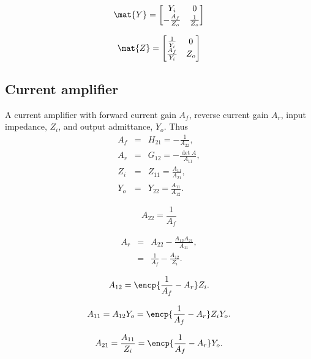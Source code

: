 \documentclass[a4paper, 12pt]{article}
\begin{document}
\begin{equation}
\mat{Y} = \left[\begin{matrix}Y_{i} & 0\\- \frac{A_{f}}{Z_{o}} & \frac{1}{Z_{o}}\end{matrix}\right]
\end{equation}

\begin{equation}
\mat{Z} = \left[\begin{matrix}\frac{1}{Y_{i}} & 0\\\frac{A_{f}}{Y_{i}} & Z_{o}\end{matrix}\right]
\end{equation}


\subsection{Current amplifier}

A current amplifier with forward current gain $A_f$, reverse current
gain $A_r$, input impedance, $Z_i$, and output admittance, $Y_o$.
Thus
%
\begin{eqnarray}
A_f & = &  H_{21} = -\frac{1}{A_{22}}, \\
A_r & = &  G_{12} = -\frac{\det{A}}{A_{11}}, \\
Z_i & = &  Z_{11} = \frac{A_{11}}{A_{21}}, \\
Y_o & = &  Y_{22} = \frac{A_{11}}{A_{12}}.
\end{eqnarray}

\begin{equation}
  A_{22} = \frac{1}{A_f}
\end{equation}

\begin{eqnarray}
  A_r & = & A_{22} - \frac{A_{12} A_{21}}{A_{11}}, \\
      & = & \frac{1}{A_f} - \frac{A_{12}}{Z_i}.
\end{eqnarray}

\begin{equation}
  A_{12} = \encp{\frac{1}{A_f} - A_r} Z_i.
\end{equation}

\begin{equation}
  A_{11} = A_{12} Y_o = \encp{\frac{1}{A_f} - A_r} Z_i Y_o.
\end{equation}

\begin{equation}
  A_{21} = \frac{A_{11}}{Z_i} = \encp{\frac{1}{A_f} - A_r} Y_o.
\end{equation}
\end{document}
